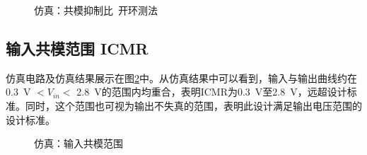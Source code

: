 \documentclass[UTF8]{ctexart}
\numberwithin{figure}{subsection}
\numberwithin{table}{subsection}
\numberwithin{equation}{subsection}
\begin{document}
\begin{figure}[H]
    \centering
    \caption{仿真：共模抑制比\ 开环测法}
    \label{CMRR open simulation}
\end{figure}

\subsection{输入共模范围 ICMR}
仿真电路及仿真结果展示在图\ref{ICMR simulation}中。从仿真结果中可以看到，输入与输出曲线约在\SI[]{0.3}{\volt} \(< V_{in} <\) \SI[]{2.8}{\volt}的范围内均重合，表明ICMR为\SI[]{0.3}{\volt}至\SI[]{2.8}{\volt}，远超设计标准。同时，这个范围也可视为输出不失真的范围，表明此设计满足输出电压范围的设计标准。

\begin{figure}[H]
    \centering
    \caption{仿真：输入共模范围}
    \label{ICMR simulation}
\end{figure}
\end{document}
